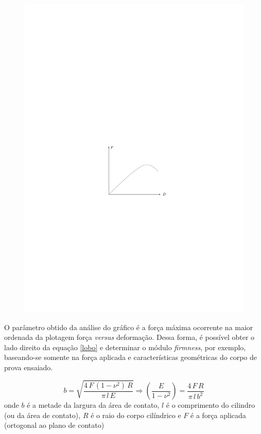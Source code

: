 \documentclass[a4paper, 12pt, brazilian]{article}
\begin{document}
\begin{itemize}
		\begin{figure}[H]
			\centering
			\includegraphics[scale=1.1]{images/brazilian}
		\end{figure}
	
		O parâmetro obtido da análise do gráfico é a força máxima ocorrente na maior ordenada da plotagem força \textit{versus} deformação. Dessa forma, é possível obter o lado direito da equação \eqref{lobo} e determinar o módulo \textit{firmness}, por exemplo, baseando-se somente na força aplicada e características geométricas do corpo de prova ensaiado.
	
		\begin{equation}
		\label{lobo}
		b=\sqrt{\dfrac{4\,F\,(1-\nu^{2})\,R}{\pi\,l\,E}}\Rightarrow \left(\dfrac{E}{1-\nu^{2}}\right)=\dfrac{4\,F\,R}{\pi\,l\,b^{2}}
		\end{equation}
		onde $b$ é a metade da largura da área de contato, $l$ é o comprimento do cilindro (ou da área de contato), $R$ é o raio do corpo cilíndrico e $F$ é a força aplicada (ortogonal ao plano de contato)	
		

\end{itemize}
\end{document}
